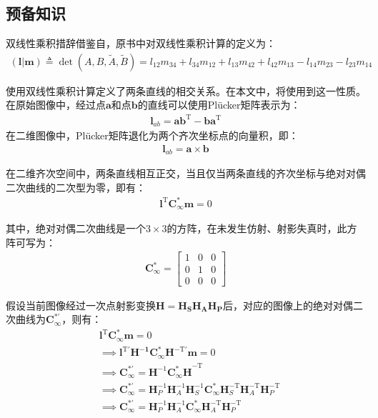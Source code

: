 \documentclass[11pt]{article}
\begin{document}
\subsection{预备知识}
双线性乘积措辞借鉴自\cite{hartley2003multiple}，原书中对双线性乘积计算的定义为：
\begin{align}
  \label{eq:bilinear}
  \mathbf{(l|m)}\triangleq \det(A,B,\tilde{A},\tilde{B})=l_{12}m_{34}+l_{34}m_{12}+l_{13}m_{42}+l_{42}m_{13}-l_{14}m_{23}-l_{23}m_{14}
\end{align}\par
使用双线性乘积计算定义了两条直线的相交关系。在本文中，将使用到这一性质。在原始图像中，经过点$\mathbf{a}$和点$\mathbf{b}$的直线可以使用Plücker矩阵表示为：
\begin{align}
  \label{eq:plucker}
  \mathbf{l}_{ab}=\mathbf{a}\mathbf{b}^\textrm{T}-\mathbf{b}\mathbf{a}^\textrm{T}
\end{align}
在二维图像中，Plücker矩阵退化为两个齐次坐标点的向量积，即：
\begin{align}
  \label{eq:plucker2d}
  \mathbf{l}_{ab}=\mathbf{a}\times\mathbf{b}
\end{align}\par
在二维齐次空间中，两条直线相互正交，当且仅当两条直线的齐次坐标与绝对对偶二次曲线的二次型为零，即有：
\begin{align}
  \mathbf{l^\mathrm{T}C_\infty^*m}=0
\end{align}
\par
其中，绝对对偶二次曲线是一个$3\times3$的方阵，在未发生仿射、射影失真时，此方阵可写为：
\begin{align*}
  \mathbf{C_\infty^*}=\begin{bmatrix}
                        1 & 0 & 0 \\
                        0 & 1 & 0 \\
                        0 & 0 & 0
                      \end{bmatrix}
\end{align*}
\par
假设当前图像经过一次点射影变换$\mathbf{H=H_SH_AH_P}$后，对应的图像上的绝对对偶二次曲线为$\mathbf{C_\infty^{*'}}$，则有：
\begin{align*}
   & \mathbf{l^\mathrm{T}C_\infty^{*}m}=0                                                                                                                                            \\
   & \implies\mathbf{l^\mathrm{T'}H^{-1}C_\infty^{*}H^\mathrm{-T'}m}=0                                                                                                               \\
   & \implies\mathbf{C_\infty^{*'}}=\mathbf{H}^{-1}\mathbf{C_\infty^*H}^{-\textrm{T}}                                                                                                \\
   & \implies\mathbf{C_\infty^{*'}}=\mathbf{H}_P^{-1}\mathbf{H}_A^{-1}\mathbf{H}_S^{-1}\mathbf{C_\infty^{*}}\mathbf{H}_S^\mathrm{-T}\mathbf{H}_A^\mathrm{-T}\mathbf{H}_P^\mathrm{-T} \\
   & \implies\mathbf{C_\infty^{*'}}=\mathbf{H}_P^{-1}\mathbf{H}_A^{-1}\mathbf{C_\infty^{*}}\mathbf{H}_A^\mathrm{-T}\mathbf{H}_P^\mathrm{-T}
\end{align*}
\end{document}
